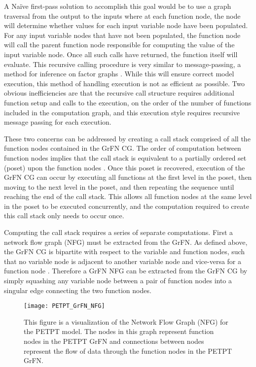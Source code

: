 A Naïve first-pass solution to accomplish this goal would be to use a graph traversal from the output to the inputs where at each function node, the node will determine whether values for each input variable node have been populated.
For any input variable nodes that have not been populated, the function node will call the parent function node responsible for computing the value of the input variable node.
Once all such calls have returned, the function itself will evaluate. This recursive calling procedure is very similar to message-passing, a method for inference on factor graphs \citep{bishop2006pattern}.
While this will ensure correct model execution, this method of handling execution is not as efficient as possible.
Two obvious inefficiencies are that the recursive call structure requires additional function setup and calls to the execution, on the order of the number of functions included in the computation graph, and this execution style requires recursive message passing for each execution.

These two concerns can be addressed by creating a call stack comprised of all the function nodes contained in the GrFN CG.
The order of computation between function nodes implies that the call stack is equivalent to a partially ordered set (poset) upon the function nodes \citep{simovici2008miningTools}.
Once this poset is recovered, execution of the GrFN CG can occur by executing all functions at the first level in the poset, then moving to the next level in the poset, and then repeating the sequence until reaching the end of the call stack.
This allows all function nodes at the same level in the poset to be executed concurrently, and the computation required to create this call stack only needs to occur once.

Computing the call stack requires a series of separate computations.
First a network flow graph (NFG) \citep{allen1970CFG} must be extracted from the GrFN.
As defined above, the GrFN CG is bipartite with respect to the variable and function nodes, such that no variable node is adjacent to another variable node and vice-versa for a function node \citep{bondy1976graph}.
Therefore a GrFN NFG can be extracted from the GrFN CG by simply squashing any variable node between a pair of function nodes into a singular edge connecting the two function nodes.

\begin{figure}[!htbp]
    \label{fig:petpt_nfg}
    \centering
    \texttt{[image: PETPT\_GrFN\_NFG]}%
    \caption[PETPT GrFN Network Flow Graph]{This figure is a visualization of the Network Flow Graph (NFG) for the PETPT model. The nodes in this graph represent function nodes in the PETPT GrFN and connections between nodes represent the flow of data through the function nodes in the PETPT GrFN.}
\end{figure}



